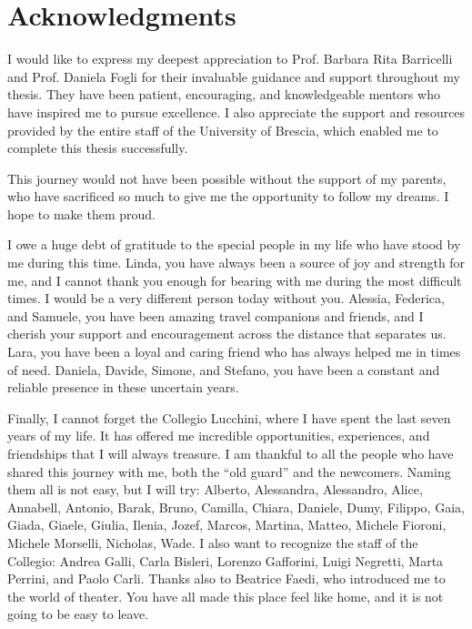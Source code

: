 \chapter*{Acknowledgments}\label{ch:acknowledgments}

I would like to express my deepest appreciation to Prof. Barbara Rita Barricelli and Prof. Daniela Fogli for their invaluable guidance and support throughout my thesis. They have been patient, encouraging, and knowledgeable mentors who have inspired me to pursue excellence. I also appreciate the support and resources provided by the entire staff of the University of Brescia, which enabled me to complete this thesis successfully.

This journey would not have been possible without the support of my parents, who have sacrificed so much to give me the opportunity to follow my dreams. I hope to make them proud.

I owe a huge debt of gratitude to the special people in my life who have stood by me during this time. Linda, you have always been a source of joy and strength for me, and I cannot thank you enough for bearing with me during the most difficult times. I would be a very different person today without you. Alessia, Federica, and Samuele, you have been amazing travel companions and friends, and I cherish your support and encouragement across the distance that separates us. Lara, you have been a loyal and caring friend who has always helped me in times of need. Daniela, Davide, Simone, and Stefano, you have been a constant and reliable presence in these uncertain years.

Finally, I cannot forget the Collegio Lucchini, where I have spent the last seven years of my life. It has offered me incredible opportunities, experiences, and friendships that I will always treasure. I am thankful to all the people who have shared this journey with me, both the “old guard” and the newcomers. Naming them all is not easy, but I will try: Alberto, Alessandra, Alessandro, Alice, Annabell, Antonio, Barak, Bruno, Camilla, Chiara, Daniele, Dumy, Filippo, Gaia, Giada, Giaele, Giulia, Ilenia, Jozef, Marcos, Martina, Matteo, Michele Fioroni, Michele Morselli, Nicholas, Wade. I also want to recognize the staff of the Collegio: Andrea Galli, Carla Bisleri, Lorenzo Gafforini, Luigi Negretti, Marta Perrini, and Paolo Carli. Thanks also to Beatrice Faedi, who introduced me to the world of theater. You have all made this place feel like home, and it is not going to be easy to leave.

